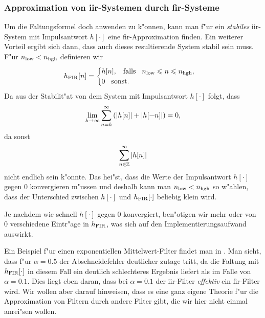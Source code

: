 \subsubsection{Approximation von \texorpdfstring{\acrshort*{iir}}{IIR}-Systemen durch \texorpdfstring{\acrshort*{fir}}{FIR}-Systeme}
Um die Faltungsformel doch anwenden zu k"onnen, kann man f"ur ein \emph{stabiles} \gls{iir}-System mit Impulsantwort $h[\cdot]$ eine \gls{fir}-Approximation finden.
Ein weiterer Vorteil ergibt sich dann, dass auch dieses resultierende System stabil sein muss.
F"ur $n_{\rm low} < n_{\rm hgh}$ definieren wir
\[
h_{\rm FIR}[n] = \begin{cases}
    h[n], {\hspace{3mm} \text{falls} \hspace{3mm}} n_{\rm low} \leqslant n \leqslant n_{\rm hgh}, \\
    0 {\hspace{3mm} \text{sonst.} \hspace{3mm}}
\end{cases}
\]
Da aus der Stabilit"at von dem System mit Impulsantwort $h[\cdot]$ folgt, dass
\[
    \lim\limits_{k \rightarrow \infty} 
        {\sum\limits_{n = k}^{\infty}{
            \left({\left| h[n] \right|} + {\left| h[-n] \right|}\right)
        }} = 0,
\]
da sonst
\[
    {\sum\limits_{n \in \mathbb{Z}}^{\infty}{{\left| h[n] \right|}}}
\]
nicht endlich sein k"onnte.
Das hei"st, dass die Werte der Impulsantwort $h[\cdot]$ gegen $0$ konvergieren m"ussen und deshalb kann man $n_{\rm low} < n_{\rm hgh}$ so w"ahlen, dass der Unterschied zwischen $h[\cdot]$ und $h_{\rm FIR}[\cdot]$ beliebig klein wird.

Je nachdem wie schnell $h[\cdot]$ gegen $0$ konvergiert, ben"otigen wir mehr oder von $0$ verschiedene Eintr"age in $h_{\rm FIR}$, was sich auf den Implementierungsaufwand auswirkt.

Ein Beispiel f"ur einen exponentiellen Mittelwert-Filter findet man in .
Man sieht, dass f"ur $\alpha=0.5$ der Abschneidefehler deutlicher zutage tritt, da die Faltung mit $h_{\rm FIR}[\cdot]$ in diesem Fall ein deutlich schlechteres Ergebnis liefert als im Falle von $\alpha=0.1$.
Dies liegt eben daran, dass bei $\alpha=0.1$ der \gls{iir}-Filter \emph{effektiv} ein \gls{fir}-Filter wird.
Wir wollen aber darauf hinweisen, dass es eine ganz eigene Theorie f"ur die Approximation von Filtern durch andere Filter gibt, die wir hier nicht einmal anrei"sen wollen.

